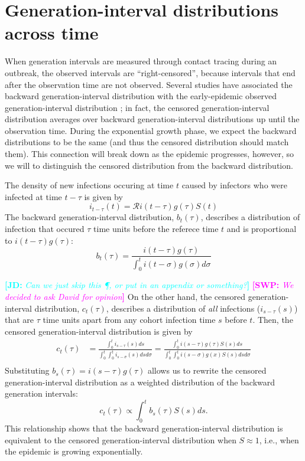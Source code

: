 \documentclass[12pt]{article}
\newcommand{\RR}{\ensuremath{{\mathcal R}}}
\newcommand{\comment}[3]{\textcolor{#1}{\textbf{[#2: }\textsl{#3}\textbf{]}}}
\newcommand{\jd}[1]{\comment{cyan}{JD}{#1}}
\newcommand{\swp}[1]{\comment{magenta}{SWP}{#1}}
\begin{document}
\section{Generation-interval distributions across time}

When generation intervals are measured through contact tracing during an outbreak, 
the observed intervals are ``right-censored'', because intervals that end after the observation time are not observed.
Several studies have associated the backward generation-interval distribution with the early-epidemic observed generation-interval distribution \citep{tomba2010some, nishiura2010time, champredon2015intrinsic, britton2019estimation};
in fact, the censored generation-interval distribution averages over backward generation-interval distributions up until the observation time.
During the exponential growth phase, we expect the backward distributions to be the same (and thus the censored distribution should match them).
This connection will break down as the epidemic progresses, however, so we will to distinguish the censored distribution from the backward distribution.

The density of new infections occuring at time $t$ caused by infectors who were infected at time $t-\tau$ is given by
\begin{equation}
i_{t-\tau}(t) = \RR i(t-\tau) g(\tau) S(t)
\end{equation}
The backward generation-interval distribution, $b_t(\tau)$, describes a distribution of infection that occured $\tau$ time units before the referece time $t$ and is proportional to $i(t-\tau) g(\tau)$:
\begin{equation}
b_t(\tau) = \frac{i(t-\tau) g(\tau)}{\int_0^t i(t-\sigma) g(\sigma) d\sigma}
\end{equation}

\jd{Can we just skip this \P, or put in an appendix or something?}
\swp{We decided to ask David for opinion}
On the other hand, the censored generation-interval distribution, $c_t(\tau)$, describes a distribution of \emph{all} infections ($i_{s-\tau}(s)$) that are $\tau$ time units apart from any cohort infection time $s$ before $t$.
Then, the censored generation-interval distribution is given by
\begin{equation}\label{eq:obsg}
\begin{aligned}
c_t(\tau) 
&= \frac{\int_0^t i_{s-\tau}(s) ds}{\int_0^t \int_0^t i_{s-\sigma}(s) ds d\sigma}= \frac{\int_0^t i(s-\tau) g(\tau) S(s) ds}{\int_0^t \int_0^t i(s-\sigma) g(x) S(s) ds d\sigma}\\
\end{aligned}
\end{equation}
Substituting $b_s(\tau) = i(s-\tau) g(\tau)$ allows us to rewrite the censored generation-interval distribution as a weighted distribution of the backward generation intervals:
\begin{equation}
c_t(\tau) \propto \int_0^t b_s(\tau) S(s) ds.
\end{equation}
This relationship shows that the backward generation-interval distribution is equivalent to the censored generation-interval distribution when $S \approx 1$, i.e., when the epidemic is growing exponentially.
\end{document}
